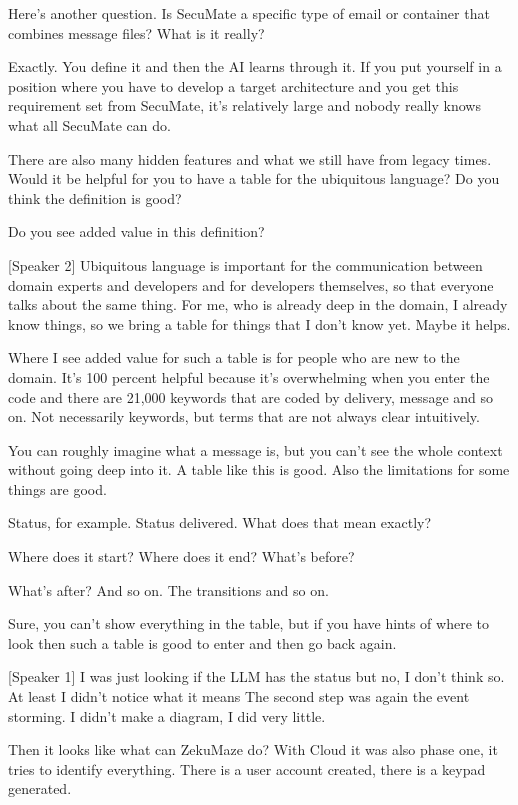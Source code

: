 Here's another question. Is SecuMate a specific type of email or container that combines message files? What is it really?

Exactly. You define it and then the AI learns through it. If you put yourself in a position where you have to develop a target architecture and you get this requirement set from SecuMate, it's relatively large and nobody really knows what all SecuMate can do.

There are also many hidden features and what we still have from legacy times. Would it be helpful for you to have a table for the ubiquitous language? Do you think the definition is good?

Do you see added value in this definition?

[Speaker 2]
Ubiquitous language is important for the communication between domain experts and developers and for developers themselves, so that everyone talks about the same thing. For me, who is already deep in the domain, I already know things, so we bring a table for things that I don't know yet. Maybe it helps.

Where I see added value for such a table is for people who are new to the domain. It's 100 percent helpful because it's overwhelming when you enter the code and there are 21,000 keywords that are coded by delivery, message and so on. Not necessarily keywords, but terms that are not always clear intuitively.

You can roughly imagine what a message is, but you can't see the whole context without going deep into it. A table like this is good. Also the limitations for some things are good.

Status, for example. Status delivered. What does that mean exactly?

Where does it start? Where does it end? What's before?

What's after? And so on. The transitions and so on.

Sure, you can't show everything in the table, but if you have hints of where to look then such a table is good to enter and then go back again.

[Speaker 1]
I was just looking if the LLM has the status but no, I don't think so. At least I didn't notice what it means The second step was again the event storming. I didn't make a diagram, I did very little.

Then it looks like what can ZekuMaze do? With Cloud it was also phase one, it tries to identify everything. There is a user account created, there is a keypad generated.

